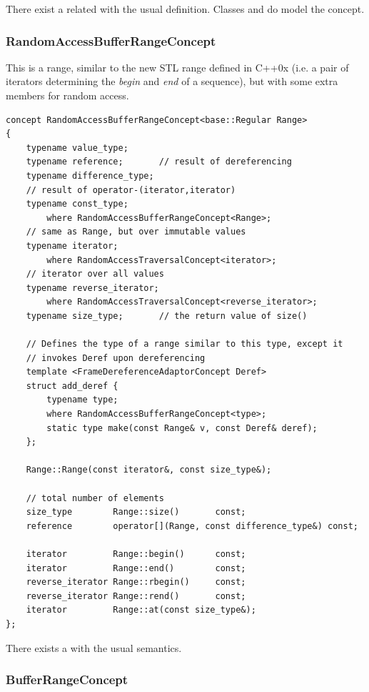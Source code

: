 There exist a related  with
the usual definition. Classes
 and
 do model the concept.

\subsubsection{RandomAccessBufferRangeConcept}

This is a range, similar to the new STL range defined in C++0x (i.e. a
pair of iterators determining the \emph{begin} and \emph{end} of a
sequence), but with some extra members for random access.

\begin{lstlisting}
concept RandomAccessBufferRangeConcept<base::Regular Range> 
{
    typename value_type;
    typename reference;       // result of dereferencing
    typename difference_type;
    // result of operator-(iterator,iterator)
    typename const_type; 
        where RandomAccessBufferRangeConcept<Range>;
    // same as Range, but over immutable values
    typename iterator; 
        where RandomAccessTraversalConcept<iterator>;
    // iterator over all values
    typename reverse_iterator;
        where RandomAccessTraversalConcept<reverse_iterator>; 
    typename size_type;       // the return value of size()

    // Defines the type of a range similar to this type, except it
    // invokes Deref upon dereferencing
    template <FrameDereferenceAdaptorConcept Deref>
    struct add_deref {
        typename type;
        where RandomAccessBufferRangeConcept<type>;
        static type make(const Range& v, const Deref& deref);
    };
    
    Range::Range(const iterator&, const size_type&);
    
    // total number of elements
    size_type        Range::size()       const; 
    reference        operator[](Range, const difference_type&) const;
    
    iterator         Range::begin()      const;
    iterator         Range::end()        const;
    reverse_iterator Range::rbegin()     const;
    reverse_iterator Range::rend()       const;
    iterator         Range::at(const size_type&);
};
\end{lstlisting}

There exists a  with the usual
semantics.

\subsubsection{BufferRangeConcept}

